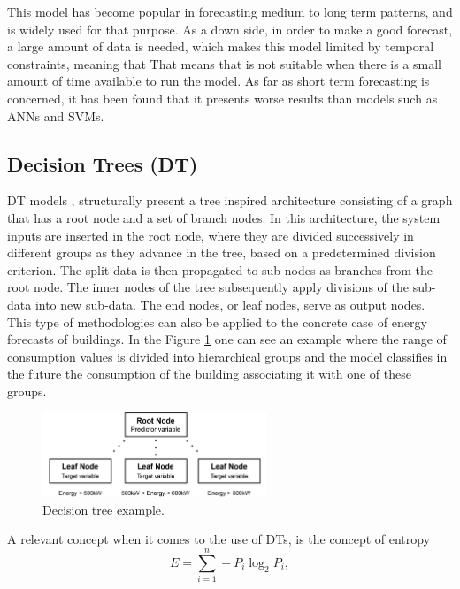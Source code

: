 This model has become popular in forecasting medium to long term patterns, and is widely used for that purpose. As a down side, in order to make a good forecast, a large amount of data is needed, which makes this model limited by temporal constraints, meaning that That means that is not suitable when there is a small amount of time available to run the model. As far as short term forecasting is concerned, it has been found that it presents worse results than models such as \ac{ANN}s and \ac{SVM}s.

\subsection{Decision Trees (DT)}

\ac{DT} models \cite{dt1}, structurally present a tree inspired architecture consisting of a graph that has a root node and a set of branch nodes. In this architecture, the system inputs are inserted in the root node, where they are divided successively in different groups as they advance in the tree, based on a predetermined division criterion. The split data is then propagated to sub-nodes as branches from the root node. The inner nodes of the tree subsequently apply divisions of the sub-data into new sub-data. The end nodes, or leaf nodes, serve as output nodes. This type of methodologies can also be applied to the concrete case of energy forecasts of buildings. In the Figure \ref{dt} one can see an example where the range of consumption values is divided into hierarchical groups and the model classifies in the future the consumption of the building associating it with one of these groups.


\begin{figure}[h!]
    \centering
    \begin{center}
    \includegraphics[width=0.6\textwidth]{Images/DT.png}
    \caption{Decision tree example.}
    \label{dt}
    \end{center}
\end{figure}

A relevant concept when it comes to the use of \ac{DT}s, is the concept of entropy
\begin{equation}
       E=\sum_{i=1}^n -P_i\log_2P_i,
\label{entropy}
\end{equation}

